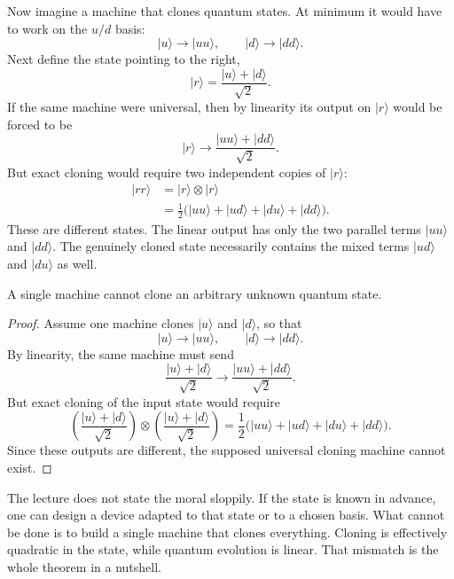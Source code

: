 Now imagine a machine that clones quantum states. At minimum it would have to work on the \(u/d\) basis:
\begin{equation}
|u\rangle \to |uu\rangle,
\qquad
|d\rangle \to |dd\rangle.
\end{equation}
Next define the state pointing to the right,
\begin{equation}
|r\rangle=\frac{|u\rangle+|d\rangle}{\sqrt{2}}.
\end{equation}
If the same machine were universal, then by linearity its output on \(|r\rangle\) would be forced to be
\begin{equation}
|r\rangle \to \frac{|uu\rangle+|dd\rangle}{\sqrt{2}}.
\end{equation}
But exact cloning would require two independent copies of \(|r\rangle\):
\begin{align}
|rr\rangle
&=
|r\rangle\otimes |r\rangle \\
&=
\frac{1}{2}
\bigl(
|uu\rangle+|ud\rangle+|du\rangle+|dd\rangle
\bigr).
\end{align}
These are different states. The linear output has only the two parallel terms \(|uu\rangle\) and \(|dd\rangle\). The genuinely cloned state necessarily contains the mixed terms \(|ud\rangle\) and \(|du\rangle\) as well.

\begin{theorem}[No-cloning]
A single machine cannot clone an arbitrary unknown quantum state.
\end{theorem}

\begin{proof}
Assume one machine clones \(|u\rangle\) and \(|d\rangle\), so that
\[
|u\rangle \to |uu\rangle,
\qquad
|d\rangle \to |dd\rangle.
\]
By linearity, the same machine must send
\[
\frac{|u\rangle+|d\rangle}{\sqrt{2}}
\to
\frac{|uu\rangle+|dd\rangle}{\sqrt{2}}.
\]
But exact cloning of the input state would require
\[
\left(\frac{|u\rangle+|d\rangle}{\sqrt{2}}\right)
\otimes
\left(\frac{|u\rangle+|d\rangle}{\sqrt{2}}\right)
=
\frac{1}{2}
\bigl(
|uu\rangle+|ud\rangle+|du\rangle+|dd\rangle
\bigr).
\]
Since these outputs are different, the supposed universal cloning machine cannot exist.
\end{proof}

The lecture does not state the moral sloppily. If the state is known in advance, one can design a device adapted to that state or to a chosen basis. What cannot be done is to build a single machine that clones everything. Cloning is effectively quadratic in the state, while quantum evolution is linear. That mismatch is the whole theorem in a nutshell.

